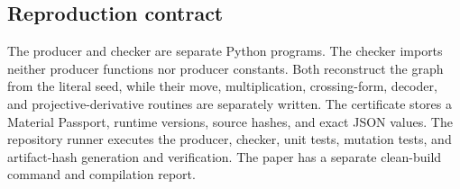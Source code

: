 \subsection{Reproduction contract}

The producer and checker are separate Python programs.  The checker imports
neither producer functions nor producer constants.  Both reconstruct the
graph from the literal seed, while their move, multiplication, crossing-form,
decoder, and projective-derivative routines are separately written.  The
certificate stores a Material Passport, runtime versions, source hashes,
and exact JSON values.  The repository runner executes the producer,
checker, unit tests, mutation tests, and artifact-hash generation and
verification.  The paper has a separate clean-build command and compilation
report.
